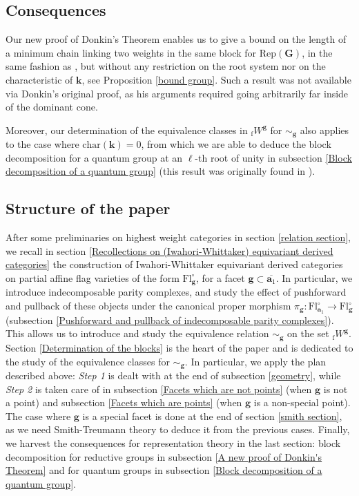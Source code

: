 \documentclass[11pt]{amsart}
\theoremstyle{plain}
\theoremstyle{remark}
\numberwithin{equation}{section}
\begin{document}
\subsection{Consequences}
Our new proof of Donkin's Theorem enables us to give a bound on the length of a minimum chain linking two weights in the same block for $\mathrm{Rep}(\mathbf{G})$, in the same fashion as \cite[Corollary 3.1]{article}, but without any restriction on the root system nor on the characteristic of $\mathbf{k}$, see Proposition \ref{bound group}. Such a result was not available via Donkin's original proof, as his arguments required going arbitrarily far inside of the dominant cone. 

Moreover, our determination of the equivalence classes in ${_\mathrm{f}W}^\mathbf{g}$ for $\sim_\mathbf{g}$ also applies to the case where $\mathrm{char}(\mathbf{k})=0$, from which we are able to deduce the block decomposition for a quantum group at an $\ell$-th root of unity in subsection \ref{Block decomposition of a quantum group} (this result was originally found in \cite{thams1994blocks}).
	 \subsection{Structure of the paper}
	 After some preliminaries on highest weight categories in section \ref{relation section}, we recall in section \ref{Recollections on (Iwahori-Whittaker) equivariant derived categories} the construction of Iwahori-Whittaker equivariant derived categories on partial affine flag varieties of the form $\mathrm{Fl}^{\circ}_{\mathbf{g}}$, for a facet $\mathbf{g}\subset\overline{\mathbf{a}_1}$. In particular, we introduce indecomposable parity complexes, and study the effect of pushforward and pullback of these objects under the canonical proper morphism $\pi_{\mathbf{g}}:\mathrm{Fl}^{\circ}_{\mathbf{a}_1}\to \mathrm{Fl}^{\circ}_{\mathbf{g}}$ (subsection \ref{Pushforward and pullback of indecomposable parity complexes}). This allows us to introduce and study the equivalence relation $\sim_\mathbf{g}$ on the set ${_\mathrm{f}W}^\mathbf{g}$. Section \ref{Determination of the blocks} is the heart of the paper and is dedicated to the study of the equivalence classes for $\sim_\mathbf{g}$. In particular, we apply the plan described above: \textit{Step 1} is dealt with at the end of subsection \ref{geometry}, while \textit{Step 2} is taken care of in  subsection \ref{Facets which are not points} (when $\mathbf{g}$ is not a point) and  subsection \ref{Facets which are points} (when $\mathbf{g}$ is a non-special point). The case where $\mathbf{g}$ is a special facet is done at the end of section \ref{smith section}, as we need Smith-Treumann theory to deduce it from the previous cases. Finally, we harvest the consequences for representation theory in the last section: block decomposition for reductive groups in subsection \ref{A new proof of Donkin's Theorem} and for quantum groups in subsection \ref{Block decomposition of a quantum group}.
\end{document}
